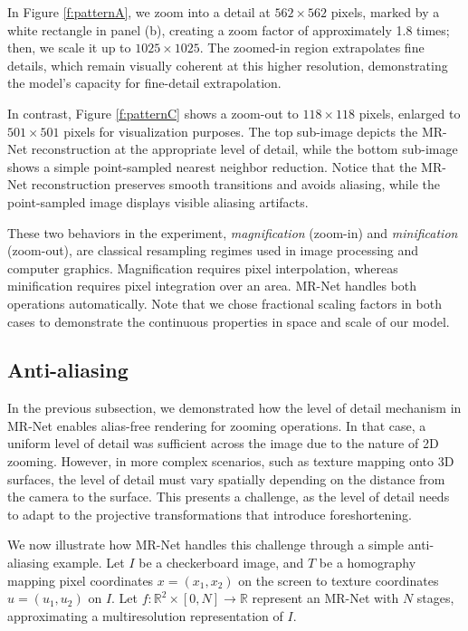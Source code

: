 In Figure \ref{f:patternA}, we zoom into a detail at \(562 \times 562\) pixels, marked by a white rectangle in panel (b), creating a zoom factor of approximately 1.8 times; then, we scale it up to \(1025 \times 1025\). The zoomed-in region extrapolates fine details, which remain visually coherent at this higher resolution, demonstrating the model's capacity for fine-detail extrapolation.

In contrast, Figure \ref{f:patternC} shows a zoom-out to \(118 \times 118\) pixels, enlarged to \(501 \times 501\) pixels for visualization purposes. The top sub-image depicts the MR-Net reconstruction at the appropriate level of detail, while the bottom sub-image shows a simple point-sampled nearest neighbor reduction. Notice that the MR-Net reconstruction preserves smooth transitions and avoids aliasing, while the point-sampled image displays visible aliasing artifacts.

These two behaviors in the experiment, \textit{magnification} (zoom-in) and \textit{minification} (zoom-out), are classical resampling regimes used in image processing \citep{pixel} and computer graphics. Magnification requires pixel interpolation, whereas minification requires pixel integration over an area. MR-Net handles both operations automatically. Note that we chose fractional scaling factors in both cases to demonstrate the continuous properties in space and scale of our model.

\subsection{Anti-aliasing}

In the previous subsection, we demonstrated how the level of detail mechanism in MR-Net enables alias-free rendering for zooming operations. In that case, a uniform level of detail was sufficient across the image due to the nature of 2D zooming. However, in more complex scenarios, such as texture mapping onto 3D surfaces, the level of detail must vary spatially depending on the distance from the camera to the surface. This presents a challenge, as the level of detail needs to adapt to the projective transformations that introduce foreshortening.

We now illustrate how MR-Net handles this challenge through a simple anti-aliasing example. Let \(I\) be a checkerboard image, and \(T\) be a homography mapping pixel coordinates \(x = (x_1, x_2)\) on the screen to texture coordinates \(u = (u_1, u_2)\) on \(I\). Let \(f: \mathbb{R}^2 \times [0, N] \to \mathbb{R}\) represent an MR-Net with \(N\) stages, approximating a multiresolution representation of \(I\).

